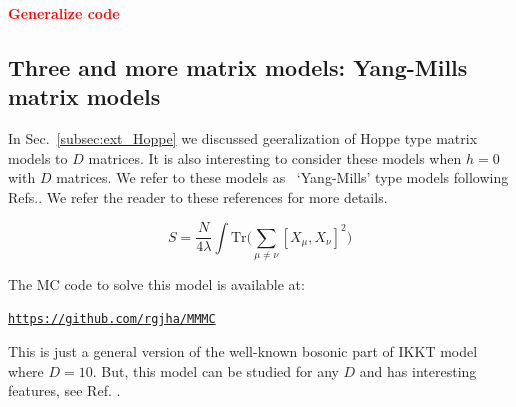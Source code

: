 \documentclass[11pt]{article}
\newcommand{\TODO}[1]{\textcolor{red}{{\bf #1}}}
\begin{document}
\TODO{Generalize code} 


\subsection{Three and more matrix models: Yang-Mills matrix models}

In Sec.~\ref{subsec:ext_Hoppe} we discussed geeralization of Hoppe type matrix models to $D$ matrices. 
It is also interesting to consider these models when $h=0$ with $D$ matrices. We refer to these models 
as ~`Yang-Mills' type models following Refs.\cite{Krauth:1998yu,Krauth:1999qw}. We refer the reader to these
references for more details. 


\begin{equation}
	\label{eq:CTmodel} 
S = \frac{N}{4\lambda} \int \mbox{Tr} \Bigg( \sum_{\mu \neq \nu}[X_\mu, X_\nu]^{2}\Bigg) 
\end{equation}

The MC code to solve this model is
available at:

\begin{center} \texttt{\href{https://github.com/rgjha/MMMC}{https://github.com/rgjha/MMMC}} \end{center}

This is just a general version of the well-known bosonic part of IKKT model
where $D=10$. But, this model can be studied for any $D$ and has 
interesting features, see Ref. \cite{Hotta:1998en}. 
\end{document}
